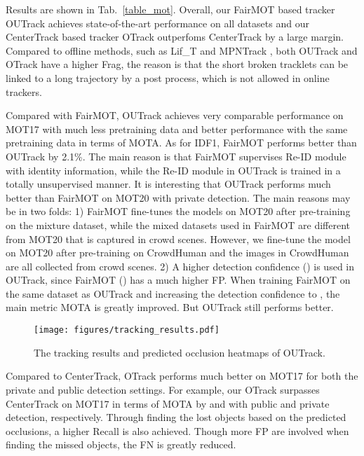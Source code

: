 \documentclass[final,1p,times,twocolumn]{elsarticle}
\newcommand{\tref}[1]{Tab.~\ref{#1}}
\begin{document}
	Results are shown in \tref{table_mot}. Overall, our FairMOT based tracker OUTrack achieves state-of-the-art performance on all datasets and our CenterTrack based tracker OTrack outperfoms CenterTrack by a large margin. Compared to offline methods, such as Lif\_T \cite{hornakova2020lifted} and MPNTrack \cite{braso2020learning}, both OUTrack and OTrack  have a higher Frag, the reason is that the short broken tracklets can be linked to a long trajectory by a post process, which is not allowed in online trackers.
	
	Compared with FairMOT, OUTrack achieves very comparable performance on MOT17 with much less pretraining data and better performance with the same pretraining data in terms of MOTA. As for IDF1, FairMOT performs better  than OUTrack by 2.1\%. The main reason is that FairMOT supervises Re-ID module with identity information, while the Re-ID module in OUTrack is trained in a totally unsupervised manner. 
	It is interesting that OUTrack performs much better than FairMOT on MOT20 with private detection. The main reasons may be in two folds: 1) FairMOT fine-tunes the models on MOT20 after pre-training on the mixture dataset, while the mixed datasets used in FairMOT are different from MOT20 that is captured in crowd scenes. However, we fine-tune the model on MOT20 after pre-training on CrowdHuman and the images in CrowdHuman are all collected from crowd scenes. 2) A higher detection confidence () is used in OUTrack, since FairMOT () has a much higher FP. When training FairMOT on the same dataset as OUTrack and increasing the detection confidence to , the main metric MOTA is greatly improved. But OUTrack still performs better.
	
	
	\begin{figure*}[t]\centering
		\texttt{[image: figures/tracking\_results.pdf]}
		\caption{
			The tracking results and predicted occlusion heatmaps of OUTrack.  
		}
		\label{figure_tracking_results}
	\end{figure*}
	
	
	
	
	Compared to CenterTrack, OTrack performs much better on MOT17 for both the private and public detection settings. For example, our OTrack surpasses CenterTrack on MOT17 in terms of MOTA by  and  with public and private detection, respectively. 
	Through finding the lost objects based on the predicted occlusions, a higher Recall is also achieved. Though more FP are involved when finding the missed objects, the FN is greatly reduced.
	
\end{document}
